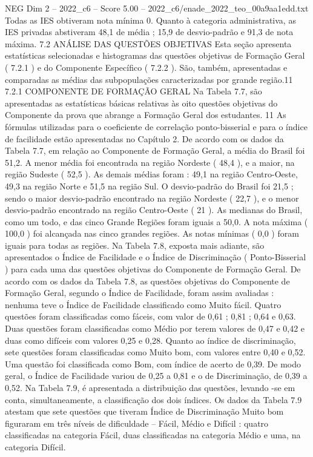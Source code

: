 \begin{textsample}{NEG Dim 2 – 2022\_c6 – Score 5.00 – 2022\_c6/enade\_2022\_teo\_00a9aa1edd.txt}
Todas as IES obtiveram nota mínima 0.
Quanto à categoria administrativa, as IES privadas abstiveram 48,1 de média ; 15,9 de desvio-padrão e 91,3 de nota máxima. 7.2 ANÁLISE DAS QUESTÕES OBJETIVAS Esta seção apresenta estatísticas selecionadas e histogramas das questões objetivas de Formação Geral ( 7.2.1 ) e do Componente Específico ( 7.2.2 ).
São, também, apresentadas e comparadas as médias das subpopulações caracterizadas por grande região.11 7.2.1 COMPONENTE DE FORMAÇÃO GERAL Na Tabela 7.7, são apresentadas as estatísticas básicas relativas às oito questões objetivas do Componente da prova que abrange a Formação Geral dos estudantes. 11 As fórmulas utilizadas para o coeficiente de correlação ponto-bisserial e para o índice de facilidade estão apresentadas no Capítulo 2.
De acordo com os dados da Tabela 7.7, em relação ao Componente de Formação Geral, a média do Brasil foi 51,2.
A menor média foi encontrada na região Nordeste ( 48,4 ), e a maior, na região Sudeste ( 52,5 ).
As demais médias foram : 49,1 na região Centro-Oeste, 49,3 na região Norte e 51,5 na região Sul.
O desvio-padrão do Brasil foi 21,5 ; sendo o maior desvio-padrão encontrado na região Nordeste ( 22,7 ), e o menor desvio-padrão encontrado na região Centro-Oeste ( 21 ).
As medianas do Brasil, como um todo, e das cinco Grande Regiões foram iguais a 50,0.
A nota máxima ( 100,0 ) foi alcançada nas cinco grandes regiões.
As notas mínimas ( 0,0 ) foram iguais para todas as regiões.
Na Tabela 7.8, exposta mais adiante, são apresentados o Índice de Facilidade e o Índice de Discriminação ( Ponto-Bisserial ) para cada uma das questões objetivas do Componente de Formação Geral.
De acordo com os dados da Tabela 7.8, as questões objetivas do Componente de Formação Geral, segundo o Índice de Facilidade, foram assim avaliadas : nenhuma teve o Índice de Facilidade classificado como Muito fácil.
Quatro questões foram classificadas como fáceis, com valor de 0,61 ; 0,81 ; 0,64 e 0,63.
Duas questões foram classificadas como Médio por terem valores de 0,47 e 0,42 e duas como difíceis com valores 0,25 e 0,28.
Quanto ao índice de discriminação, sete questões foram classificadas como Muito bom, com valores entre 0,40 e 0,52.
Uma questão foi classificada como Bom, com índice de acerto de 0,39.
De modo geral, o Índice de Facilidade variou de 0,25 a 0,81 e o de Discriminação, de 0,39 a 0,52.
Na Tabela 7.9, é apresentada a distribuição das questões, levando -se em conta, simultaneamente, a classificação dos dois índices.
Os dados da Tabela 7.9 atestam que sete questões que tiveram Índice de Discriminação Muito bom figuraram em três níveis de dificuldade – Fácil, Médio e Difícil : quatro classificadas na categoria Fácil, duas classificadas na categoria Médio e uma, na categoria Difícil.

\end{textsample}
